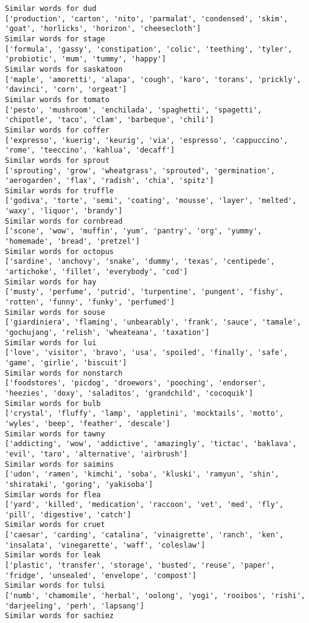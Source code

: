 \documentclass[11pt]{article}
\begin{document}
\begin{Verbatim}[commandchars=\\\{\}]
Similar words for dud
['production', 'carton', 'nito', 'parmalat', 'condensed', 'skim', 'goat', 'horlicks', 'horizon', 'cheesecloth']
Similar words for stage
['formula', 'gassy', 'constipation', 'colic', 'teething', 'tyler', 'probiotic', 'mum', 'tummy', 'happy']
Similar words for saskatoon
['maple', 'amoretti', 'alapa', 'cough', 'karo', 'torans', 'prickly', 'davinci', 'corn', 'orgeat']
Similar words for tomato
['pesto', 'mushroom', 'enchilada', 'spaghetti', 'spagetti', 'chipotle', 'taco', 'clam', 'barbeque', 'chili']
Similar words for coffer
['expresso', 'kuerig', 'keurig', 'via', 'espresso', 'cappuccino', 'rome', 'teeccino', 'kahlua', 'decaff']
Similar words for sprout
['sprouting', 'grow', 'wheatgrass', 'sprouted', 'germination', 'aerogarden', 'flax', 'radish', 'chia', 'spitz']
Similar words for truffle
['godiva', 'torte', 'semi', 'coating', 'mousse', 'layer', 'melted', 'waxy', 'liquor', 'brandy']
Similar words for cornbread
['scone', 'wow', 'muffin', 'yum', 'pantry', 'org', 'yummy', 'homemade', 'bread', 'pretzel']
Similar words for octopus
['sardine', 'anchovy', 'snake', 'dummy', 'texas', 'centipede', 'artichoke', 'fillet', 'everybody', 'cod']
Similar words for hay
['musty', 'perfume', 'putrid', 'turpentine', 'pungent', 'fishy', 'rotten', 'funny', 'funky', 'perfumed']
Similar words for souse
['giardiniera', 'flaming', 'unbearably', 'frank', 'sauce', 'tamale', 'gochujang', 'relish', 'wheateana', 'taxation']
Similar words for lui
['love', 'visitor', 'bravo', 'usa', 'spoiled', 'finally', 'safe', 'game', 'girlie', 'biscuit']
Similar words for nonstarch
['foodstores', 'picdog', 'droewors', 'pooching', 'endorser', 'heezies', 'doxy', 'saladitos', 'grandchild', 'cocoquik']
Similar words for bulb
['crystal', 'fluffy', 'lamp', 'appletini', 'mocktails', 'motto', 'wyles', 'beep', 'feather', 'descale']
Similar words for tawny
['addicting', 'wow', 'addictive', 'amazingly', 'tictac', 'baklava', 'evil', 'taro', 'alternative', 'airbrush']
Similar words for saimins
['udon', 'ramen', 'kimchi', 'soba', 'kluski', 'ramyun', 'shin', 'shirataki', 'goring', 'yakisoba']
Similar words for flea
['yard', 'killed', 'medication', 'raccoon', 'vet', 'med', 'fly', 'pill', 'digestive', 'catch']
Similar words for cruet
['caesar', 'carding', 'catalina', 'vinaigrette', 'ranch', 'ken', 'insalata', 'vinegarette', 'waff', 'coleslaw']
Similar words for leak
['plastic', 'transfer', 'storage', 'busted', 'reuse', 'paper', 'fridge', 'unsealed', 'envelope', 'compost']
Similar words for tulsi
['numb', 'chamomile', 'herbal', 'oolong', 'yogi', 'rooibos', 'rishi', 'darjeeling', 'perh', 'lapsang']
Similar words for sachiez

\end{Verbatim}
\end{document}
